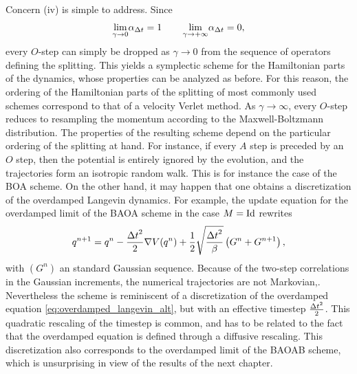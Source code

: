      \begin{remark}
        Concern (iv) is simple to address. Since
        \[\underset{\gamma \to 0}{\lim}\alpha_{\Delta t}=1\,\qquad \underset{\gamma \to +\infty}{\lim}\alpha_{\Delta t}=0,\]
        every $O$-step can simply be dropped as $\gamma\to 0$ from the sequence of operators defining the splitting. 
        This yields a symplectic scheme for the Hamiltonian parts of the dynamics, whose properties can be analyzed as before.
        For this reason, the ordering of the Hamiltonian parts of the splitting of most commonly used schemes correspond to that of a velocity Verlet method.
         As $\gamma \to \infty$, 
        every $O$-step reduces to resampling the momentum according to the Maxwell-Boltzmann distribution. 
        The properties of the resulting scheme depend on the particular ordering of the splitting at hand. 
        For instance, if every $A$ step is preceded by an $O$ step, then the potential is entirely ignored by the evolution, and the trajectories form an isotropic random walk. This is for instance the case of the BOA scheme.
        On the other hand, it may happen that one obtains a discretization of the overdamped Langevin dynamics. For example, the update equation for the overdamped limit of the BAOA scheme in the case $M=\mathrm{Id}$ rewrites
        \[q^{n+1}=q^n -\frac{{\Delta t}^2}2\nabla V(q^n)+\frac12\sqrt{\frac{{\Delta t}^2}\beta}\left(G^n+G^{n+1}\right),\]
        with $(G^n)$ an \iid standard Gaussian sequence. Because of the two-step correlations in the Gaussian increments, the numerical trajectories are not Markovian,.
        Nevertheless the scheme is reminiscent of a discretization of the overdamped equation \eqref{eq:overdamped_langevin_alt}, but with an effective timestep $\frac{{\Delta t}^2}2$. 
        This quadratic rescaling of the timestep is common, and has to be related to the fact that the overdamped equation is defined through a diffusive rescaling.
        This discretization also corresponds to the overdamped limit of the BAOAB scheme, which is unsurprising in view of the results of the next chapter.
     \end{remark}

